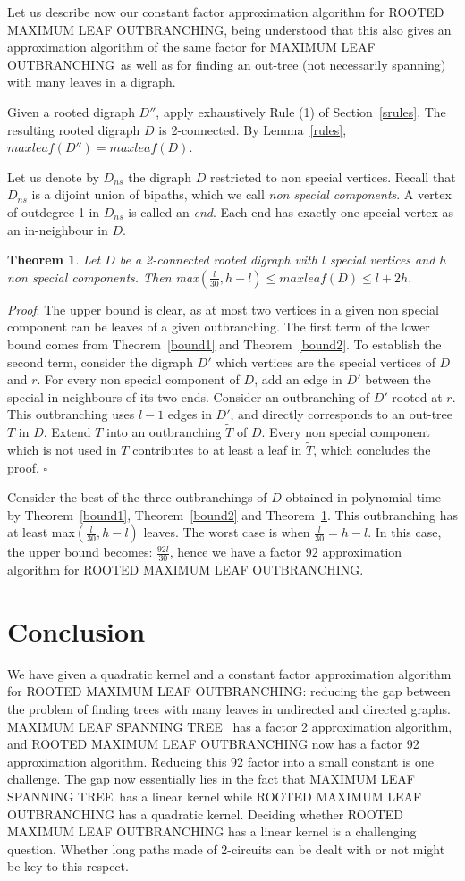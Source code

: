 \documentclass{article}
\newtheorem{theorem}{Theorem}
\def\RMO{R{\footnotesize{OOTED}} M{\footnotesize{AXIMUM}} L{\footnotesize{EAF}} O{\footnotesize{UTBRANCHING}} }
\def\RMOB{R{\footnotesize{OOTED}} M{\footnotesize{AXIMUM}} L{\footnotesize{EAF}} O{\footnotesize{UTBRANCHING}}. }
\def\RMOC{R{\footnotesize{OOTED}} M{\footnotesize{AXIMUM}} L{\footnotesize{EAF}} O{\footnotesize{UTBRANCHING}}: }
\def\RMOD{R{\footnotesize{OOTED}} M{\footnotesize{AXIMUM}} L{\footnotesize{EAF}} O{\footnotesize{UTBRANCHING}}, }
\def\MO{M{\footnotesize{AXIMUM}} L{\footnotesize{EAF}} O{\footnotesize{UTBRANCHING}}}
\def\ML{M{\footnotesize{AXIMUM}} L{\footnotesize{EAF}} S{\footnotesize{PANNING}} T{\footnotesize{REE}}}
\begin{document}
Let us describe now our constant factor approximation algorithm for \RMOD being understood that this also gives an approximation algorithm of the same factor for \MO ~as well as for finding an out-tree (not necessarily spanning) with many leaves in a digraph.

Given a rooted digraph $D''$, apply exhaustively Rule (1) of Section~\ref{srules}. The resulting rooted digraph $D$ is 2-connected. By Lemma~\ref{rules}, $maxleaf(D'')=maxleaf(D)$.

Let us denote by $D_{ns}$ the digraph $D$ restricted to non special vertices. Recall that $D_{ns}$ is a dijoint union of bipaths, which we call \emph{non special components}. A vertex of outdegree 1 in $D_{ns}$ is called an \emph{end}. Each end has exactly one special vertex as an in-neighbour in $D$.

 
\begin{theorem}\label{majbound} 
Let $D$ be a 2-connected rooted digraph with $l$ special vertices and $h$ non special components. Then max$(\frac{l}{30},h-l)\le maxleaf(D)\le l+2h$.
\end{theorem}
\emph{Proof}: The upper bound is clear, as at most two vertices in a given non special component can be leaves of a given outbranching. The first term of the lower bound comes from Theorem~\ref{bound1} and Theorem~\ref{bound2}. To establish the second term, consider the digraph $D'$ which vertices are the special vertices of $D$ and $r$. For every non special component of $D$, add an edge in $D'$ between the special in-neighbours of its two ends. Consider an outbranching of $D'$ rooted at $r$. This outbranching uses $l-1$ edges in $D'$, and directly corresponds to an out-tree $T$ in $D$. Extend $T$ into an outbranching $\tilde{T}$ of $D$. Every non special component which is not used in $T$ contributes to at least a leaf in $\tilde{T}$, which concludes the proof.
$\square$


\vspace{12pt}

Consider the best of the three outbranchings of $D$ obtained in polynomial time by Theorem~\ref{bound1}, Theorem~\ref{bound2} and Theorem~\ref{majbound}. This outbranching has at least max$(\frac{l}{30},h-l)$ leaves. The worst case is when $\frac{l}{30}=h-l$. In this case, the upper bound becomes: $\frac{92l}{30}$, hence we have a factor $92$ approximation algorithm for \RMOB


\section{Conclusion}
We have given a quadratic kernel and a constant factor approximation algorithm for \RMOC reducing the gap between the problem of finding trees with many leaves in undirected and directed graphs. \ML ~ has a factor 2 approximation algorithm, and \RMO now has a factor 92 approximation algorithm. Reducing this 92 factor into a small constant is one challenge. The gap now essentially lies in the fact that \ML ~has a linear kernel while \RMO has a quadratic kernel. Deciding whether \RMO has a linear kernel is a challenging question. Whether long paths made of 2-circuits can be dealt with or not might be key to this respect.





\end{document}
